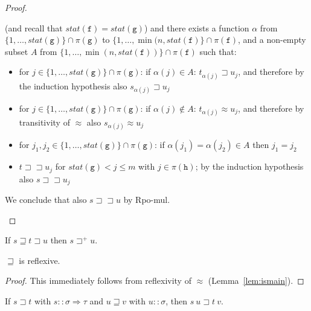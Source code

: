 \documentclass[a4paper,USenglish,cleveref,autoref,thm-restate]{lipics-v2021}
\newcommand{\arrtype}{\Rightarrow}
\newcommand{\grmain}{\sqsupset}
\newcommand{\geqmain}{\sqsupseteq}
\newcommand{\ismain}{\approx}
\newcommand{\rpomain}{\sqsupset\!\!\sqsupset}
\newcommand{\symb}[1]{\mathtt{#1}}
\newcommand{\afun}{\symb{f}}
\newcommand{\bfun}{\symb{g}}
\newcommand{\cfun}{\symb{h}}
\newcommand{\atype}{\sigma}
\newcommand{\btype}{\tau}
\newcommand{\status}{\mathit{stat}}
\newcommand{\filter}{\pi}
\begin{document}
\begin{proof}
\begin{itemize}
  (and recall that $\status(\afun) = \status(\bfun)$) and there exists a function
  $\alpha$ from $\{1,\dots,\status(\bfun)\} \cap \filter(\bfun)$ to $\{1,\dots,\min(n,
  \status(\afun)\} \cap \filter(\afun)$, and a non-empty subset $A$ from $\{1,\dots,\min(n,
  \status(\afun))\} \cap \filter(\afun)$ such that:
  \begin{itemize}
  \item for $j \in \{1,\dots,\status(\bfun)\} \cap \filter(\bfun)$:
    if $\alpha(j) \in A$: $t_{\alpha(j)} \grmain u_j$, and therefore by the induction
    hypothesis also $s_{\alpha(j)} \grmain u_j$
  \item for $j \in \{1,\dots,\status(\bfun)\} \cap \filter(\bfun)$:
    if $\alpha(j) \notin A$: $t_{\alpha(j)} \ismain u_j$, and therefore by transitivity of
    $\ismain$ also $s_{\alpha(j)} \ismain u_j$
  \item for $j_1,j_2 \in \{1,\dots,\status(\bfun)\} \cap \filter(\bfun)$:
    if $\alpha(j_1) = \alpha(j_2) \in A$ then $j_1 = j_2$
  \item $t \rpomain u_j$ for $\status(\bfun) < j \leq m$ with $j \in \filter(\cfun)$; by
    the induction hypothesis also $s \rpomain u_j$
  \end{itemize}
  We conclude that also $s \rpomain u$ by Rpo-mul.
\end{itemize}
\end{proof}

\begin{corollary}\label{cor:compatibility}
If $s \geqmain t \grmain u$ then $s \grmain^+ u$.
\end{corollary}

\begin{lemma}\label{lem:reflexive}
$\geqmain$ is reflexive.
\end{lemma}

\begin{proof}
This immediately follows from reflexivity of $\ismain$ (Lemma~\ref{lem:ismain}).
\end{proof}

\begin{lemma}\label{lem:leftmono}
If $s \grmain t$ with $s :: \atype \arrtype \btype$ and $u \geqmain v$ with $u :: \atype$, then
$s\ u \grmain t\ v$.
\end{lemma}
\end{document}
